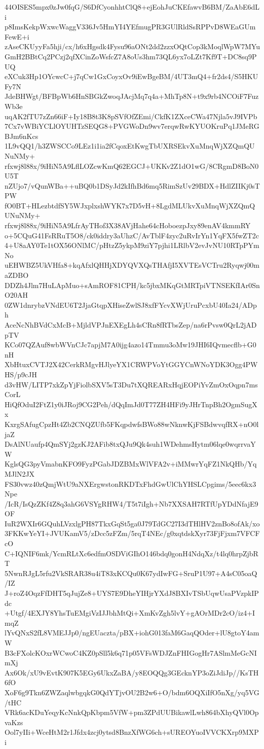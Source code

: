 44OISES5mpx0zJw0fqG/S6DfCyonhhtClQ8+ejEohJuCKEfawvB6BM/ZaAbE6dLi
p8ImsKekpWxwcWaggV336Jv5HmYI4YEfmugPR3GUlRldSsRPPvD8WEaGUmFewE+i
zAseCKUyyFa5hji/cx/h6xHgsdk4Fysu96aONt2dd2zzxOQtCop3kMoqlWpW7MYu
GmH2BBtCq2PCzj2qfXCinZoWsfcZ7A8oUs3hm73QL6yx7oLZt7Kf9T+DC8sq9PUQ
eXCuk3Hp1OYcwcC+j7qCw1GxCoyxOv9iEwBgeBM/4UT3mQ4+fr2ds4/S5HKUFy7N
JdeBHWgt/BFBpWb6HnSBGkZwoqJAcjMq7q4a+MhTp8N+t9x9rb4NCOiF7FuzWb3e
uqAK2fTU7zZn66iF+Iy18B8t3K8pSVfOfZEmi/CkfK1ZXceCWa47Njla5vJ9IVPb
7Cx7vWBiYCLlOYUHTzSEQG8+PVGWoDn9wv7erqwRwKYUOKruPq1JMeRGBJm6nKcs
1L9vQQ1/h3ZWSCCo9LEz1i1ia2fCqoxEtKwgTbUXRSEkvXuMnqWjXZQmQUNuNMy+
rfxwj8l88x/9iHiN5A9LflLOZcwKmQ62EGCJ+UKKv2Z1dO1wG/8CRgmD8BoN0U5T
nZUjo7/vQunWBa++uBQ0b1DSyJd2kIfhBd6mq5RimSzUv29BDX+HdlZIIKj0sTPW
fO0BT+HLezbtdfSY5WJxplxshWYK7x7D5vH+8LgdMLUkvXuMnqWjXZQmQUNuNMy+
rfxwj8l88x/9iHiN5A9LfrAyTHof3X38AVjHahe64cHoboezpJxy89enAV4kmmRY
o+5CQuG41FsRRuT5O8/ck0iddry3aUhzC/AvTblF4zyc2uRvIrYn1YqFX5fwZT2c
4+U8aAY0Te1tOX56ONlMC/pHtzZ5ykpM9ziY7pjhi1LRlbV2evJvNU10RTpPYmNo
uEHWBZ5UkVHfa8+kqAfxlQHHjXDYQVXQsTHAfjI5XVTEsVCTru2Ryqwj00maZDBO
DDZh4Jlm7HuLApMuo+sAmROF81CPH/kc5jbxMKqGtMRTpiVTNSEKfIAr0SnO20AH
0ZW1dnrybzVNdEU6T2JjaGtqpXHiseZwlSJ8xfFYcvXWjUruPcxbU40Ia24/ADph
AceNcNhBVdCxMcB+MjldVPJnEXEgLh4sCRn8fRTbsZep/na6rPvsw0QrL2jADpTV
KCo07QZAuf8wbWVnCJc7apjM7A0ijg4azo14Tmmu3oMw19JHI6IQvmecflb+G0nH
XbHtuxCVTJ2X42CerkRMgvHJlyeYX1CRWPVoYtGGYCnWNoYDK3Ogg4PWHS/p9cJH
d3vHW/LITP7xkZpYjFiolbSXV5sT3Du7tXQREARxHqjEOPiYvZmOxOqpn7msCorL
HiQfOduI2FtZ1y0iJRoj9CG2Peh/dQqImJd0T77ZH4HFi9yJHrTnpBh2OgmSugXx
KxrgSAfugCpzHt4Zb2CNQZUfb5FKqpdwfsBWo88wNknwKjFSBdwvqfRX+nO0ljaZ
DsAlNUaufp4QmSYj2gzKJ2AFib8txQJu9Qk4suh1WDehmsHytm06lqe0wqrrvaYW
KglsQG3pyVmabnKFO9FyzPGabJDZBMxWlVFA2v+iMMwrYqFZ1NkQHb/YqMJlN2JX
FS30vwz40zQmjWtU9aNXErgwstonRKDTxFhdGwUlChYHSLCpgims/5eec6kx3Npe
/IcR/IsQzZKf4Z8q3ahG6VSYgRHW4/T5t7iIgh+Nb7XXSAH7RTfUpYDdNfajE9OF
IuR2WXIr6GQuhLVzxlgPH87TkxGqSt5ga0J79TdGC27I3dTHlHV2znBo8ofAk/xo
3FKKwYeYI+JVUKamV5/zDcc5zFZm/5rqT4NEc/g0xqtdskXyr73FjFjxm7VFCFcO
C+IQNIF6mk/YcmRLtXc6edfmOSDViGIhO146bdq0gonH4NdqXz/t4lq0hrpZjbRT
5NwnRJgL5rfu2VkSRAR38u4iT83xKCQu0K67ydIwFG+SruP1U97+A4sC05oaQ/IZ
J+roZ4OqzFfDHT5qJujZe8+UYS7E9DheYIHjrYXdJ8BXIvTSbUqwUsaPVzpkIPdc
+Utgf/4EXJY8YhsTuEMgiVzIJJbhMtQi+XmKvZgh5lvY+gAOrMDr2cO/iz4+ImqZ
lYvQNxS2fL8VMEJJp0/ngEUaczta/pBX+iohG013faM6GaqQOder+lU8gtoY4amW
B3cFXolcKOxrWCwoC4KZ0pSll5k6q71p05VFsWDJZnFHIGogHr7ASlmMeGcNImXj
Ax6Ok/xU9vEvtK907K5EGy6UkxZaBA/y8EOQQg3GEcknYP3oZiJdiJp//KsTH6fO
XoF6g9Tkn6ZWZaqlwbgqkG0QdYTjvOU2B2w6+O/bdm6OQXiIfO5nXg/yq5VG/tHC
VRk6acKDuYeqyKcNnkQpKbpm5VfW+pm3ZPdUUBikawlLwh864bXhyQVl0OpvaKzs
Ool7yIIi+WceHtM2r1Jfdx4zcj0ytsd8BnzXfWG6ch+sUREOYuoIVVCKXrp9MXPi
